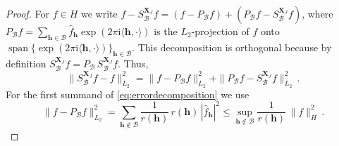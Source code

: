 \documentclass[a4paper]{amsart}
\renewcommand{\hat}{\widehat}
\DeclareMathOperator{\Span}{span}
\begin{document}
\begin{proof} For $f\in H$ we write $f-S_{\mathcal B}^{\bm X_J}f = (f-P_{\mathcal B}f) + (P_{\mathcal B}f-S_{\mathcal B}^{\bm X_J}f)$, where $P_{\mathcal B} f = \sum_{\bm h\in\mathcal B} \hat f_{\bm h} \exp(2\pi\mathrm i\langle\bm h,\cdot\rangle)$ is the $L_2$-projection of $f$ onto $\Span\{\exp(2\pi\mathrm i\langle\bm h,\cdot\rangle)\}_{\bm h\in\mathcal B}$.
    This decomposition is orthogonal because by definition $S_{\mathcal B}^{\bm X_J}f = P_{\mathcal B} \, S_{\mathcal B}^{\bm X_J}f$.
    Thus,
    \begin{equation}\label{eq:errordecomposition}
        \|S_{\mathcal B}^{\bm X_J} f - f\|_{L_2}^2
        =
        \|f - P_{\mathcal B} f\|_{L_2}^2
        + \|P_{\mathcal B} f - S_{\mathcal B}^{\bm X_J} f\|_{L_2}^2 \,.
    \end{equation}
    For the first summand of \eqref{eq:errordecomposition} we use
    \begin{equation*}
        \|f - P_{\mathcal B} f\|_{L_2}^2
        = \sum_{\bm h\notin\mathcal B} \frac{1}{r(\bm h)} \, r(\bm h) \, |\hat f_{\bm h}|^2
        \le \sup_{\bm h\notin\mathcal B} \frac{1}{r(\bm h)} \, \|f\|_H^2 \,.
    \end{equation*}


\end{proof}
\end{document}
